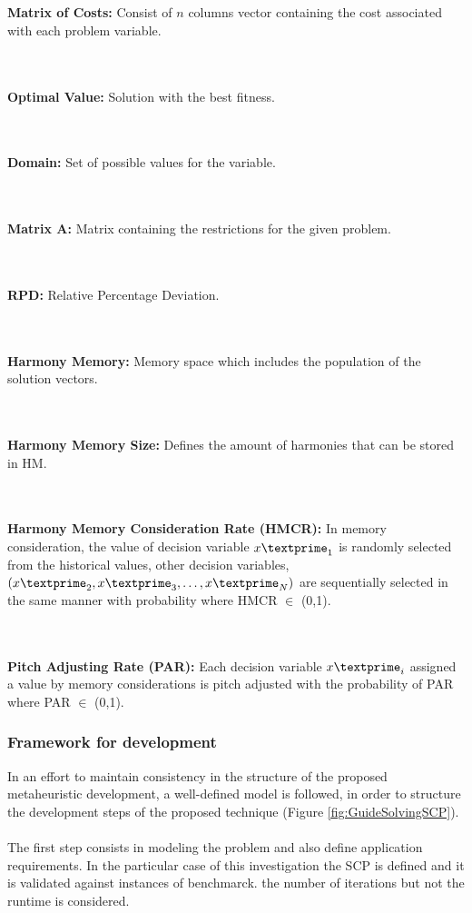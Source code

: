 ~\\~\\
\textbf{Matrix of Costs:} 
Consist of $n$ columns vector containing the cost associated with each problem variable.

~\\~\\
\textbf{Optimal Value:} 
Solution with the best fitness.

~\\~\\
\textbf{Domain:} 
Set of possible values for the variable.

~\\~\\
\textbf{Matrix A:} 
Matrix containing the restrictions for the given problem.

~\\~\\
\textbf{RPD:} 
Relative Percentage Deviation.

~\\~\\
\textbf{Harmony Memory:} 
Memory space which includes the population of the solution vectors.

~\\~\\
\textbf{Harmony Memory Size:} 
Defines the amount of harmonies that can be stored in HM.

~\\~\\
\textbf{Harmony Memory Consideration Rate (HMCR):} 
In memory consideration, the value of decision variable ${x\textprime}_1$ is randomly selected from the historical values, other decision variables, $({x\textprime}_2, {x\textprime}_3,\dots,{x\textprime}_N)$ are sequentially selected in the same manner with probability where HMCR $\in$ (0,1).

~\\~\\
\textbf{Pitch Adjusting Rate (PAR):} 
Each decision variable ${x\textprime}_i$ assigned a value by memory considerations is pitch adjusted with the probability of PAR where PAR $\in$ (0,1).

\subsubsection{Framework for development}
In an effort to maintain consistency in the structure of the proposed metaheuristic development, a well-defined model is followed, in order to structure the development steps of the proposed technique (Figure \ref{fig:GuideSolvingSCP}). \\
~\\
The first step consists in modeling the problem and also define application requirements. In the particular case of this investigation the SCP is defined and it is validated against instances of benchmarck. the number of iterations but not the runtime is considered.\\

